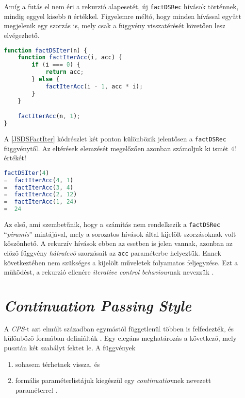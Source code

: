 Amíg a futás el nem éri a rekurzió alapesetét, új \texttt{factDSRec} hívások történnek, mindig eggyel kisebb \texttt{n} értékkel. Figyelemre méltó, hogy minden hívással együtt megjelenik egy szorzás is, mely csak a függvény visszatérését követően lesz elvégezhető.

\begin{lstlisting}[language=JavaScript, caption={\textit{Direct style} faktoriálist meghatározó függvény akkumulátorral}, captionpos=b, label=JSDSFactIter]
function factDSIter(n) {
    function factIterAcc(i, acc) {
        if (i === 0) {
            return acc;
        } else {
            factIterAcc(i - 1, acc * i);
        }
    }

    factIterAcc(n, 1);
}
\end{lstlisting}

A \ref{JSDSFactIter} kódrészlet két ponton különbözik jelentősen a \texttt{factDSRec} függvénytől. Az eltérések elemzését megelőzően azonban számoljuk ki ismét $4!$ értékét!

\begin{lstlisting}[language=JavaScript, caption={$4!$ kiszámítása \texttt{factDSIter} segítségével}, captionpos=b, numbers=none]
   factDSIter(4)
=  factIterAcc(4, 1)
=  factIterAcc(3, 4)
=  factIterAcc(2, 12)
=  factIterAcc(1, 24)
=  24
\end{lstlisting}

Az első, ami szembetűnik, hogy a számítás nem rendelkezik a \texttt{factDSRec} ``\textit{piramis}'' mintájával, mely a sorozatos hívások által kijelölt szorzásoknak volt köszönhető. A rekurzív hívások ebben az esetben is jelen vannak, azonban az előző függvény \textit{hátralevő} szorzásait az \texttt{acc} paraméterbe helyeztük. Ennek következtében nem szükséges a kijelölt műveletek folyamatos feljegyzése. Ezt a működést, a rekurzió ellenére \textit{iterative control behaviour}nak nevezzük .

\section{\textit{Continuation Passing Style}}

A \textit{CPS}-t azt elmúlt században egymástól függetlenül többen is felfedezték, és különböző formában definiálták \cite{Reynolds1993}. Egy elegáns meghatározás a következő, mely pusztán két szabályt fektet le. A függvények

\begin{enumerate}
    \item sohasem térhetnek vissza, és
    \item formális paraméterlistájuk kiegészül egy \textit{continuation}nek nevezett paraméterrel \cite{MightCPS}.
\end{enumerate}

